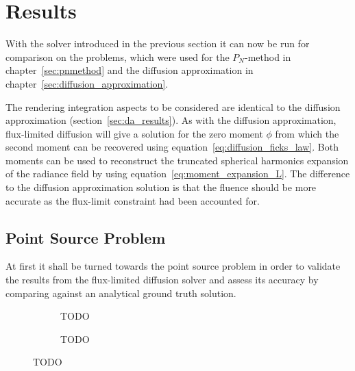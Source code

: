\section{Results}
\label{sec:fld_results}

With the solver introduced in the previous section it can now be run for comparison on the problems, which were used for the $P_N$-method in chapter~\ref{sec:pnmethod} and the diffusion approximation in chapter~\ref{sec:diffusion_approximation}.

The rendering integration aspects to be considered are identical to the diffusion approximation (section~\ref{sec:da_results}). As with the diffusion approximation, flux-limited diffusion will give a solution for the zero moment $\phi$ from which the second moment can be recovered using equation~\ref{eq:diffusion_ficks_law}. Both moments can be used to reconstruct the truncated spherical harmonics expansion of the radiance field by using equation~\ref{eq:moment_expansion_L}. The difference to the diffusion approximation solution is that the fluence should be more accurate as the flux-limit constraint had been accounted for.

\subsection{Point Source Problem}
\label{sec:pn_results_pointsource}

At first it shall be turned towards the point source problem in order to validate the results from the flux-limited diffusion solver and assess its accuracy by comparing against an analytical ground truth solution.
\begin{figure}[h]
\centering
\begin{subfigure}{0.49\columnwidth}
\caption{TODO}
\label{fig:fld_results_pointsource_1}
\end{subfigure}%
\hspace{0.01\columnwidth}
\begin{subfigure}{0.49\columnwidth}
\caption{TODO}
\label{fig:fld_results_pointsource_2}
\end{subfigure}%
\caption{TODO}
\label{fig:fld_results_pointsource}
\end{figure}

